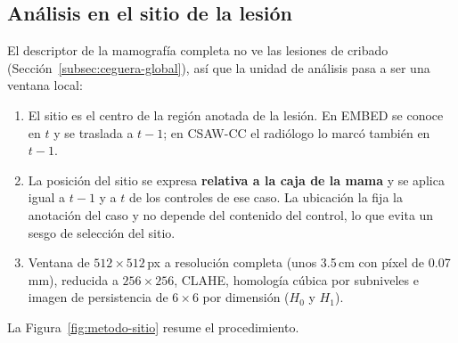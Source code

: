 \subsection{Análisis en el sitio de la lesión}
\label{subsec:metodo-sitio}
El descriptor de la mamografía completa no ve las lesiones de cribado
(Sección~\ref{subsec:ceguera-global}), así que la unidad de análisis pasa a
ser una ventana local:
\begin{enumerate}
  \item El sitio es el centro de la región anotada de la lesión. En EMBED
        se conoce en $t$ y se traslada a $t-1$; en CSAW-CC el radiólogo lo
        marcó también en $t-1$.
  \item La posición del sitio se expresa \textbf{relativa a la caja de la
        mama} y se aplica igual a $t-1$ y a $t$ de los controles de ese caso.
        La ubicación la fija la anotación del caso y no depende del
        contenido del control, lo que evita un sesgo de selección del sitio.
  \item Ventana de $512\times512$\,px a resolución completa (unos 3.5\,cm
        con píxel de 0.07\,mm), reducida a $256\times256$, CLAHE, homología
        cúbica por subniveles e imagen de persistencia de $6\times6$ por
        dimensión ($H_0$ y $H_1$).
\end{enumerate}

La Figura~\ref{fig:metodo-sitio} resume el procedimiento.

